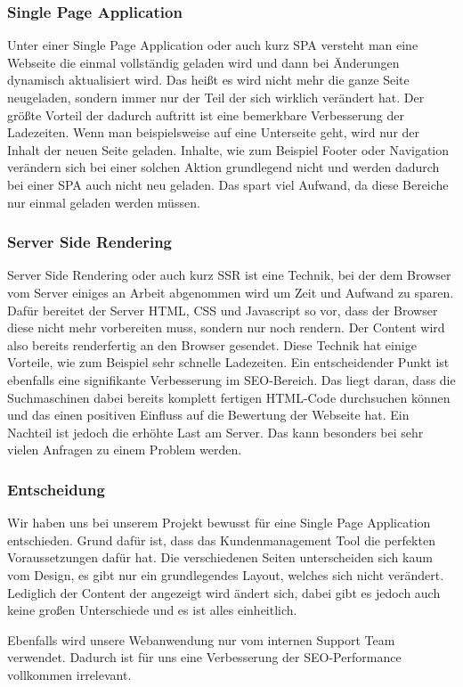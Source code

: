 \subsubsection{Single Page Application}
Unter einer Single Page Application oder auch kurz SPA versteht man eine Webseite die einmal vollständig geladen wird und dann bei Änderungen dynamisch aktualisiert wird. Das heißt es wird nicht mehr die ganze Seite neugeladen, sondern immer nur der Teil der sich wirklich verändert hat. Der größte Vorteil der dadurch auftritt ist eine bemerkbare Verbesserung der Ladezeiten. Wenn man beispielsweise auf eine Unterseite geht, wird nur der Inhalt der neuen Seite geladen. Inhalte, wie zum Beispiel Footer oder Navigation verändern sich bei einer solchen Aktion grundlegend nicht und werden dadurch bei einer SPA auch nicht neu geladen. Das spart viel Aufwand, da diese Bereiche nur einmal geladen werden müssen.
\cite{frontend_spa}

\subsubsection{Server Side Rendering}
Server Side Rendering oder auch kurz SSR ist eine Technik, bei der dem Browser vom Server einiges an Arbeit abgenommen wird um Zeit und Aufwand zu sparen. Dafür bereitet der Server HTML, CSS und Javascript so vor, dass der Browser diese nicht mehr vorbereiten muss, sondern nur noch rendern. Der Content wird also bereits renderfertig an den Browser gesendet.
Diese Technik hat einige Vorteile, wie zum Beispiel sehr schnelle Ladezeiten. Ein entscheidender Punkt ist ebenfalls eine signifikante Verbesserung im SEO-Bereich. Das liegt daran, dass die Suchmaschinen dabei bereits komplett fertigen HTML-Code durchsuchen können und das einen positiven Einfluss auf die Bewertung der Webseite hat. 
Ein Nachteil ist jedoch die erhöhte Last am Server. Das kann besonders bei sehr vielen Anfragen zu einem Problem werden.
\cite{frontend_ssr}

\subsubsection{Entscheidung}
Wir haben uns bei unserem Projekt bewusst für eine Single Page Application entschieden. Grund dafür ist, dass das Kundenmanagement Tool die perfekten Voraussetzungen dafür hat. Die verschiedenen Seiten unterscheiden sich kaum vom Design, es gibt nur ein grundlegendes Layout, welches sich nicht verändert. Lediglich der Content der angezeigt wird ändert sich, dabei gibt es jedoch auch keine großen Unterschiede und es ist alles einheitlich.

Ebenfalls wird unsere Webanwendung nur vom internen Support Team verwendet. Dadurch ist für uns eine Verbesserung der SEO-Performance vollkommen irrelevant.

\newpage
